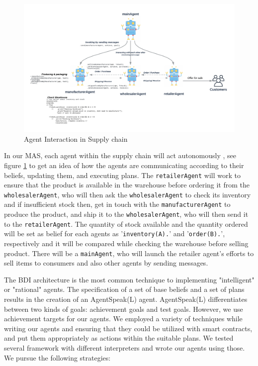 \begin{figure}[h!]
    \centering
      \includegraphics[width=\linewidth]{includes/figures/agent.png} 
      \caption{Agent Interaction in Supply chain}
      \label{Agent Interaction}
    \end{figure}
  
\vspace{.5cm}

In our \ac{MAS}, each agent within the supply chain will act autonomously , see figure \ref{Agent Interaction} to get an idea of how the agents are communicating according to their beliefs, updating them, and executing plans. The \texttt{retailerAgent} will work to ensure that the product is available in the warehouse before ordering it from the \texttt{wholesalerAgent}, who will then ask the \texttt{wholesalerAgent} to check its inventory and if insufficient stock then, get in touch with the \texttt{manufacturerAgent} to produce the product, and ship it to the \texttt{wholesalerAgent}, who will then send it to the \texttt{retailerAgent}. The quantity of stock available and the quantity ordered will be set as belief for each agents as '\texttt{inventory(A).}' and '\texttt{order(B).}', respectively and it will be compared while checking the warehouse before selling product. There will be a \texttt{mainAgent}, who will launch the retailer agent's efforts to sell items to consumers and also other agents by sending messages.

\vspace{.5cm}

The \ac{BDI} architecture is the most common technique to implementing "intelligent" or "rational" agents. The specification of a set of base beliefs and a set of plans results in the creation of an AgentSpeak(L) agent. AgentSpeak(L) differentiates between two kinds of goals: achievement goals and test goals. However, we use achievement targets for our agents. We employed a variety of techniques while writing our agents and ensuring that they could be utilized with smart contracts, and put them appropriately as actions within the suitable plans. We tested several framework with different interpreters and wrote our agents using those. We pursue the following strategies:
 \vspace{.3cm }

